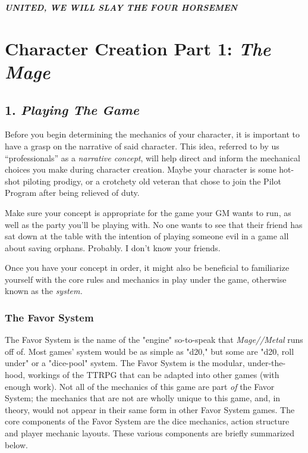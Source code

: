 \documentclass[
]{article}
\begin{document}
\textbf{\emph{UNITED, WE WILL SLAY THE FOUR HORSEMEN}}

\hypertarget{character-creation-part-1-the-mage}{%
\section{\texorpdfstring{Character Creation Part 1: \emph{The
Mage}}{Character Creation Part 1: The Mage}}\label{character-creation-part-1-the-mage}}

\hypertarget{playing-the-game}{%
\subsection{\texorpdfstring{1. \emph{Playing The
Game}}{1. Playing The Game}}\label{playing-the-game}}

Before you begin determining the mechanics of your character, it is
important to have a grasp on the narrative of said character. This idea,
referred to by us ``professionals'' as a \emph{narrative concept}, will
help direct and inform the mechanical choices you make during character
creation. Maybe your character is some hot-shot piloting prodigy, or a
crotchety old veteran that chose to join the Pilot Program after being
relieved of duty.

Make sure your concept is appropriate for the game your GM wants to run,
as well as the party you'll be playing with. No one wants to see that
their friend has sat down at the table with the intention of playing
someone evil in a game all about saving orphans. Probably. I don't know
your friends.

Once you have your concept in order, it might also be beneficial to
familiarize yourself with the core rules and mechanics in play under the
game, otherwise known as the \emph{system.}

\hypertarget{the-favor-system}{%
\subsubsection{The Favor System}\label{the-favor-system}}

The Favor System is the name of the "engine" so-to-speak that
{{\emph{Mage//Metal}}} runs off of. Most games' system would be as
simple as "d20," but some are "d20, roll under" or a "dice-pool" system.
The Favor System is the modular, under-the-hood, workings of the TTRPG
that can be adapted into other games (with enough work). Not all of the
mechanics of this game are part \emph{of} the Favor System; the
mechanics that are not are wholly unique to this game, and, in theory,
would not appear in their same form in other Favor System games. The
core components of the Favor System are the dice mechanics, action
structure and player mechanic layouts. These various components are
briefly summarized below.
\end{document}
